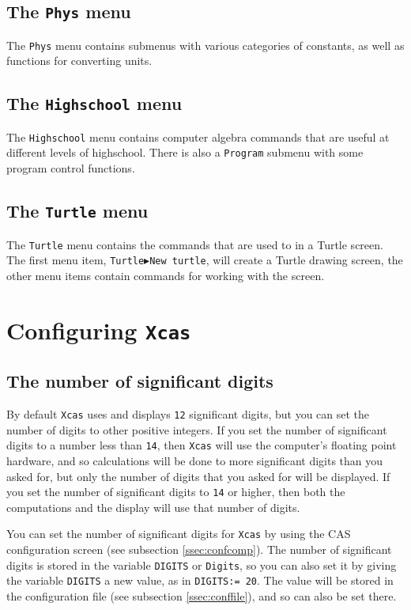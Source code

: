 \documentclass[a4paper,11pt]{book}
\begin{document}
\subsection{The \texttt{Phys} menu}

The \texttt{Phys} menu contains submenus with various categories of
constants, as well as functions for converting units.

\subsection{The \texttt{Highschool} menu}

The \texttt{Highschool} menu contains computer algebra commands that
are useful at different levels of highschool.  There is also a
\texttt{Program} submenu with some program control functions.

\subsection{The \texttt{Turtle} menu}

The \texttt{Turtle} menu contains the commands that are used to in a
Turtle screen.  The first menu item,
\texttt{Turtle$\blacktriangleright$New turtle}, will create a Turtle
drawing screen, the other menu items contain commands for working with
the screen.

\section{Configuring \texttt{Xcas}}
\label{sec:config}

\subsection{The number of significant digits}
\label{ssec:sigdig}

By default \texttt{Xcas} uses and displays \texttt{12} significant
digits, but you can set the number of digits to other positive
integers.  If you set the number of significant digits to a number
less than \texttt{14}, then \texttt{Xcas} will use the computer's
floating point hardware, and so calculations will be done to more
significant digits than you asked for, but only the number of digits
that you asked for will be displayed.  If you set the number of
significant digits to \texttt{14} or higher, then both the
computations and the display will use that number of digits.

You can set the number of significant digits for \texttt{Xcas} by
using the CAS configuration screen (see subsection \ref{ssec:confcomp}).  
The number of significant 
digits is stored in the variable \texttt{DIGITS} or \texttt{Digits},
so you can also set it by giving the variable \texttt{DIGITS} a new
value, as in \texttt{DIGITS:= 20}.  The value will be stored in the
configuration file (see subsection \ref{ssec:conffile}), and so can also be set there.
\end{document}
